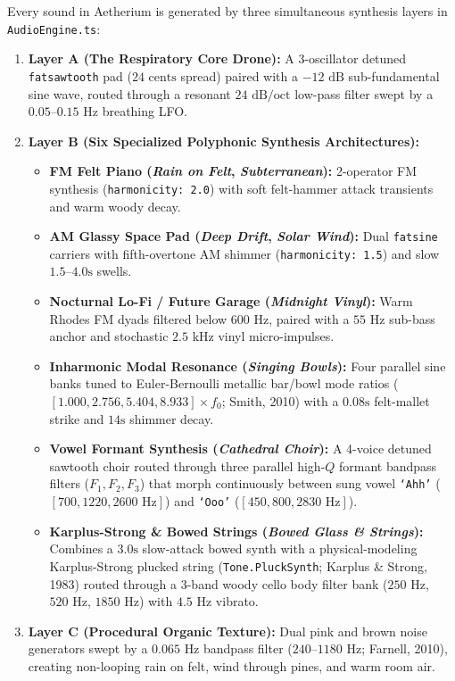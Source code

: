 \documentclass[11pt,oneside,openany]{book}
\begin{document}
Every sound in Aetherium is generated by three simultaneous synthesis layers in \texttt{AudioEngine.ts}:
\begin{enumerate}
  \item \textbf{Layer A (The Respiratory Core Drone):} A 3-oscillator detuned \texttt{fatsawtooth} pad ($24\text{ cents}$ spread) paired with a $-12\text{ dB}$ sub-fundamental sine wave, routed through a resonant $24\text{ dB/oct}$ low-pass filter swept by a $0.05\text{--}0.15\text{ Hz}$ breathing LFO.
  \item \textbf{Layer B (Six Specialized Polyphonic Synthesis Architectures):}
    \begin{itemize}
      \item \textbf{FM Felt Piano (\textit{Rain on Felt}, \textit{Subterranean}):} 2-operator FM synthesis (\texttt{harmonicity: 2.0}) with soft felt-hammer attack transients and warm woody decay.
      \item \textbf{AM Glassy Space Pad (\textit{Deep Drift}, \textit{Solar Wind}):} Dual \texttt{fatsine} carriers with fifth-overtone AM shimmer (\texttt{harmonicity: 1.5}) and slow $1.5\text{--}4.0\text{s}$ swells.
      \item \textbf{Nocturnal Lo-Fi / Future Garage (\textit{Midnight Vinyl}):} Warm Rhodes FM dyads filtered below $600\text{ Hz}$, paired with a $55\text{ Hz}$ sub-bass anchor and stochastic $2.5\text{ kHz}$ vinyl micro-impulses.
      \item \textbf{Inharmonic Modal Resonance (\textit{Singing Bowls}):} Four parallel sine banks tuned to Euler-Bernoulli metallic bar/bowl mode ratios ($[1.000, 2.756, 5.404, 8.933] \times f_0$; Smith, 2010) with a $0.08\text{s}$ felt-mallet strike and $14\text{s}$ shimmer decay.
      \item \textbf{Vowel Formant Synthesis (\textit{Cathedral Choir}):} A 4-voice detuned sawtooth choir routed through three parallel high-$Q$ formant bandpass filters ($F_1, F_2, F_3$) that morph continuously between sung vowel \texttt{`Ahh'} ($[700, 1220, 2600\text{ Hz}]$) and \texttt{`Ooo'} ($[450, 800, 2830\text{ Hz}]$).
      \item \textbf{Karplus-Strong \& Bowed Strings (\textit{Bowed Glass \& Strings}):} Combines a $3.0\text{s}$ slow-attack bowed synth with a physical-modeling Karplus-Strong plucked string (\texttt{Tone.PluckSynth}; Karplus \& Strong, 1983) routed through a 3-band woody cello body filter bank ($250\text{ Hz}$, $520\text{ Hz}$, $1850\text{ Hz}$) with $4.5\text{ Hz}$ vibrato.
    \end{itemize}
  \item \textbf{Layer C (Procedural Organic Texture):} Dual pink and brown noise generators swept by a $0.065\text{ Hz}$ bandpass filter ($240\text{--}1180\text{ Hz}$; Farnell, 2010), creating non-looping rain on felt, wind through pines, and warm room air.
\end{enumerate}
\end{document}
